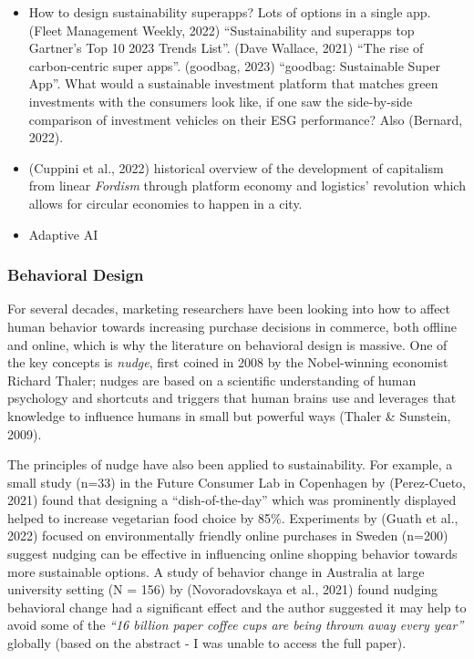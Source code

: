 \documentclass[
  letterpaper,
  DIV=11,
  numbers=noendperiod]{scrartcl}
\begin{document}
\begin{itemize}
\item
  How to design sustainability superapps? Lots of options in a single
  app. (Fleet Management Weekly, 2022) ``Sustainability and superapps
  top Gartner's Top 10 2023 Trends List''. (Dave Wallace, 2021) ``The
  rise of carbon-centric super apps''. (goodbag, 2023) ``goodbag:
  Sustainable Super App''. What would a sustainable investment platform
  that matches green investments with the consumers look like, if one
  saw the side-by-side comparison of investment vehicles on their ESG
  performance? Also (Bernard, 2022).
\item
  (Cuppini et al., 2022) historical overview of the development of
  capitalism from linear \emph{Fordism} through platform economy and
  logistics' revolution which allows for circular economies to happen in
  a city.
\item
  Adaptive AI
\end{itemize}

\subsubsection{Behavioral Design}\label{behavioral-design}

For several decades, marketing researchers have been looking into how to
affect human behavior towards increasing purchase decisions in commerce,
both offline and online, which is why the literature on behavioral
design is massive. One of the key concepts is \emph{nudge}, first coined
in 2008 by the Nobel-winning economist Richard Thaler; nudges are based
on a scientific understanding of human psychology and shortcuts and
triggers that human brains use and leverages that knowledge to influence
humans in small but powerful ways (Thaler \& Sunstein, 2009).

The principles of nudge have also been applied to sustainability. For
example, a small study (n=33) in the Future Consumer Lab in Copenhagen
by (Perez-Cueto, 2021) found that designing a ``dish-of-the-day'' which
was prominently displayed helped to increase vegetarian food choice by
85\%. Experiments by (Guath et al., 2022) focused on environmentally
friendly online purchases in Sweden (n=200) suggest nudging can be
effective in influencing online shopping behavior towards more
sustainable options. A study of behavior change in Australia at large
university setting (N = 156) by (Novoradovskaya et al., 2021) found
nudging behavioral change had a significant effect and the author
suggested it may help to avoid some of the \emph{``16 billion paper
coffee cups are being thrown away every year''} globally (based on the
abstract - I was unable to access the full paper).
\end{document}
